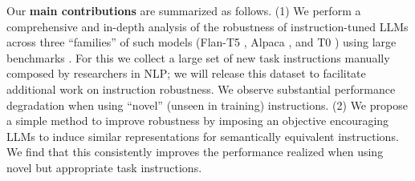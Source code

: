 Our {\bf main contributions} are summarized as follows. (1) We perform a comprehensive and in-depth analysis of the robustness of instruction-tuned LLMs across three ``families'' of such models (Flan-T5 \cite{wei2021finetuned}, Alpaca \cite{alpaca}, and T0 \cite{sanh2021multitask}) using large benchmarks \cite{hendrycks2020measuring,srivastava2022beyond}.
For this we collect a large set of new task instructions manually composed by researchers in NLP; we will release this dataset to facilitate additional work on instruction robustness. We observe substantial performance degradation when using ``novel'' (unseen in training) instructions.
(2) We propose a simple method to improve robustness by imposing an objective encouraging LLMs to induce similar representations for semantically equivalent instructions.
We find that this consistently improves the performance realized when using novel but appropriate task instructions.






\begin{comment}
The most current Large Language Models (LLMs), such as PaLM \cite{chowdhery2022palm}, Chinchilla \cite{hoffmann2022training}, and GLM-130B \cite{zeng2022glm}, have achieved remarkable performance on many NLP tasks and their downstream applications.
These LLMs are known for their strong generalizability and in-context learning brought by the emergent ability.
It has been recently discovered that further fine-tuning these models with instructions yields even better zero-shot and few-shot performance on unseen tasks \cite{chung2022scaling, ouyang2022training}.
This procedure is commonly referred to as instruction fine-tuning.
With instruction tuning, models like Flan-T5-XXL can even outperform its counterpart GPT-3, which is 16 times larger in size \cite{chung2022scaling}.
\end{comment}

